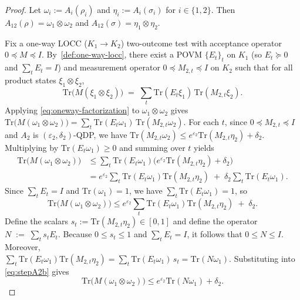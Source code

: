 \documentclass[11pt]{article}
\def\Tr{\mathrm{Tr}}
\theoremstyle{plain}
\theoremstyle{remark}
\begin{document}
\begin{proof}
Let $\omega_i:=A_i(\rho_i)$ and $\eta_i:=A_i(\sigma_i)$ for $i\in\{1,2\}$. Then
$A_{12}(\rho)=\omega_1\otimes\omega_2$ and $A_{12}(\sigma)=\eta_1\otimes\eta_2$.

Fix a one-way LOCC ($K_1\to K_2$) two-outcome test with acceptance operator $0\preceq M\preceq I$.
By~\cref{def:one-way-locc}, there exist a POVM $\{E_t\}_t$ on $K_1$ (so $E_t\succeq 0$ and
$\sum_t E_t=I$) and measurement operator $0\preceq M_{2,t}\preceq I$ on $K_2$ such that for all product states
$\xi_1\otimes\xi_2$,
\begin{equation}
\label{eq:oneway-factorization}
\Tr\!\big(M(\xi_1\otimes\xi_2)\big) \;=\; \sum_t \Tr(E_t\xi_1)\,\Tr(M_{2,t}\xi_2).
\end{equation}
Applying \eqref{eq:oneway-factorization} to $\omega_1\otimes\omega_2$ gives
$
\Tr\!\big(M(\omega_1\otimes\omega_2)\big)
= \sum_t \Tr(E_t\omega_1)\,\Tr(M_{2,t}\omega_2).
$
For each $t$, since $0\preceq M_{2,t}\preceq I$ and $A_2$ is $(\varepsilon_2,\delta_2)$-QDP, we have $
\Tr(M_{2,t}\omega_2)\le e^{\varepsilon_2}\Tr(M_{2,t}\eta_2)+\delta_2.$
Multiplying by $\Tr(E_t\omega_1)\ge 0$ and summing over $t$ yields
\begin{align}
\Tr\!\big(M(\omega_1\otimes\omega_2)\big)
&\le \sum_t \Tr(E_t\omega_1)\Big(e^{\varepsilon_2}\Tr(M_{2,t}\eta_2)+\delta_2\Big) \nonumber\\
&= e^{\varepsilon_2}\sum_t \Tr(E_t\omega_1)\Tr(M_{2,t}\eta_2)\;+\;\delta_2\sum_t \Tr(E_t\omega_1).
\label{eq:stepA2}
\end{align}
Since $\sum_t E_t=I$ and $\Tr(\omega_1)=1$, we have $\sum_t \Tr(E_t\omega_1)=1$, so
\begin{equation}
\label{eq:stepA2b}
\Tr\!\big(M(\omega_1\otimes\omega_2)\big)
\le e^{\varepsilon_2}\sum_t \Tr(E_t\omega_1)\Tr(M_{2,t}\eta_2)\;+\;\delta_2.
\end{equation}
Define the scalars $s_t:=\Tr(M_{2,t}\eta_2)\in[0,1]$ and define the operator
$
N \;:=\;\sum_t s_t E_t.
$
Because $0\le s_t\le 1$ and $\sum_t E_t=I$, it follows that $0\le N\le I$. Moreover, \\
$
\sum_t \Tr(E_t\omega_1)\Tr(M_{2,t}\eta_2)
= \sum_t \Tr(E_t\omega_1)\,s_t
= \Tr(N\omega_1).
$
Substituting into \eqref{eq:stepA2b} gives
\begin{equation}
\label{eq:reduceN}
\Tr\!\big(M(\omega_1\otimes\omega_2)\big)
\le e^{\varepsilon_2}\Tr(N\omega_1)+\delta_2.
\end{equation}


\end{proof}
\end{document}

